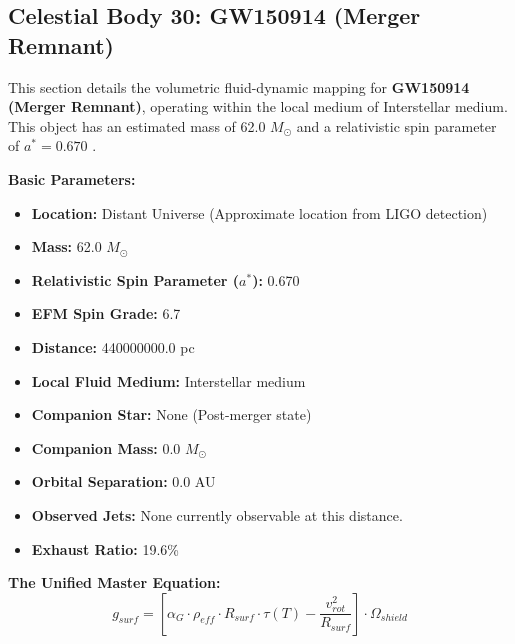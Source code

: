 \documentclass[11pt, a4paper]{article}
\begin{document}
\clearpage
\subsection{Celestial Body 30: GW150914 (Merger Remnant)}
This section details the volumetric fluid-dynamic mapping for \textbf{GW150914 (Merger Remnant)}, operating within the local medium of Interstellar medium. This object has an estimated mass of 62.0 $M_{\odot}$ and a relativistic spin parameter of $a^* = 0.670$ \cite{abbott2016, ned}.

\vspace{0.5em}
\noindent \textbf{Basic Parameters:}
\begin{itemize}
  \item \textbf{Location:} Distant Universe (Approximate location from LIGO detection)
  \item \textbf{Mass:} 62.0 $M_{\odot}$
  \item \textbf{Relativistic Spin Parameter ($a^*$):} 0.670
  \item \textbf{EFM Spin Grade:} 6.7
  \item \textbf{Distance:} 440000000.0 pc
  \item \textbf{Local Fluid Medium:} Interstellar medium
  \item \textbf{Companion Star:} None (Post-merger state)
  \item \textbf{Companion Mass:} 0.0 $M_{\odot}$
  \item \textbf{Orbital Separation:} 0.0 AU
  \item \textbf{Observed Jets:} None currently observable at this distance.
  \item \textbf{Exhaust Ratio:} 19.6\%
\end{itemize}

\vspace{0.5em}
\noindent \textbf{The Unified Master Equation:}
$$ g_{surf} = \left[ \alpha_G \cdot \rho_{eff} \cdot R_{surf} \cdot \tau(T) - \frac{v_{rot}^2}{R_{surf}} \right] \cdot \Omega_{shield} $$
\end{document}
